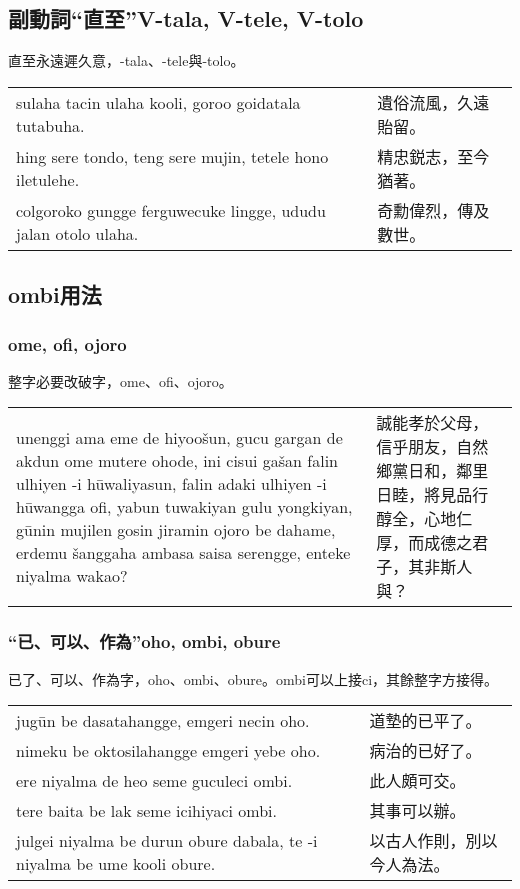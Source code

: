 \documentclass{article}
\begin{document}
\subsection{副動詞“直至”V-tala, V-tele, V-tolo}
\noindent 直至永遠遲久意，-tala、-tele與-tolo。
\begin{center}
    \begin{tabularx}{\textwidth}{XX}
        sulaha tacin ulaha kooli, goroo goidatala tutabuha.& 遺俗流風，久遠貽留。\\
        hing sere tondo, teng sere mujin, tetele hono iletulehe. & 精忠鋭志，至今猶著。\\
        colgoroko gungge ferguwecuke lingge, ududu jalan otolo ulaha. & 奇勳偉烈，傳及數世。
    \end{tabularx}
\end{center}

\subsection{ombi用法}
\subsubsection{ome, ofi, ojoro}
\noindent 整字必要改破字，ome、ofi、ojoro。
\begin{center}
    \begin{tabularx}{\textwidth}{XX}
        unenggi ama eme de hiyoo\v{s}un, gucu gargan de akdun ome mutere ohode, ini cisui ga\v{s}an falin ulhiyen -i h\={u}waliyasun, falin adaki ulhiyen -i h\={u}wangga ofi, yabun tuwakiyan gulu yongkiyan, g\={u}nin mujilen gosin jiramin ojoro be dahame, erdemu \v{s}anggaha ambasa saisa serengge, enteke niyalma wakao? & 誠能孝於父母，信乎朋友，自然鄉黨日和，鄰里日睦，將見品行醇全，心地仁厚，而成德之君子，其非斯人與？
    \end{tabularx}
\end{center}

\subsubsection{“已、可以、作為”oho, ombi, obure}
\noindent 已了、可以、作為字，oho、ombi、obure。ombi可以上接ci，其餘整字方接得。
\begin{center}
    \begin{tabularx}{\textwidth}{XX}
        jug\={u}n be dasatahangge, emgeri necin oho. & 道墊的已平了。\\
        nimeku be oktosilahangge emgeri yebe oho. & 病治的已好了。\\
        ere niyalma de heo seme guculeci ombi. & 此人頗可交。\\
        tere baita be lak seme icihiyaci ombi. & 其事可以辦。\\
        julgei niyalma be durun obure dabala, te -i niyalma be ume kooli obure. & 以古人作則，別以今人為法。
    \end{tabularx}
\end{center}
\end{document}
